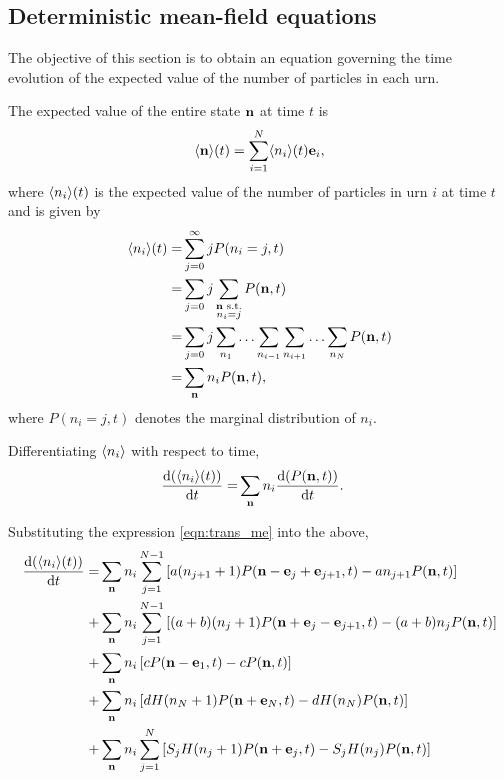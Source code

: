 \subsection{Deterministic mean-field equations}
The objective of this section is to obtain an equation governing the time
evolution of the expected value of the number of particles in each urn.

The expected value of the entire state \(\mathbf{n}\) at time \(t\) is
\begin{equation*}
    \langle \mathbf{n} \rangle(t) = \sum_{i=1}^N \langle n_i \rangle(t) \mathbf{e}_i,
\end{equation*}
where \(\langle n_i \rangle(t)\) is the expected value of the number of particles in urn
\(i\) at time \(t\) and is given by
\begin{align*}
    \langle n_i \rangle(t) =& \sum_{j=0}^\infty j P(n_i = j,t)\\
    =& \sum_{j=0} j
    \sum_{\substack{\mathbf{n} \text{ s.t.} \\ n_i=j}} P(\mathbf{n},t)\\
    =& \sum_{j=0} j
    \sum_{n_1} \dotso \sum_{n_{i-1}} \sum_{n_{i+1}} \dotso \sum_{n_N} P(\mathbf{n},t)\\
    =& \sum_{\mathbf{n}} n_i P(\mathbf{n},t),
\end{align*}
where \(P(n_i = j,t)\) denotes the marginal distribution of \(n_i\).

Differentiating \(\langle n_i \rangle\) with respect to time,
\begin{align*}
    \frac{\mathrm{d} (\langle n_i \rangle(t))}{\mathrm{d} t} =& \sum_{\mathbf{n}} n_i \frac{\mathrm{d} (P(\mathbf{n},t))}{\mathrm{d} t}.
\end{align*}

Substituting the expression \eqref{eqn:trans_me} into the above,
\begin{subequations}
\begin{align}
    \label{eqn:trans_expectation_hl_term}
    \frac{\mathrm{d} (\langle n_i \rangle(t))}{\mathrm{d} t}
    = & \sum_{\mathbf{n}} n_i \sum_{j=1}^{N-1}
    \left[a(n_{j+1}+1) P(\mathbf{n} - \mathbf{e}_j + \mathbf{e}_{j+1},t) -
        an_{j+1} P(\mathbf{n},t)\right] \\
    \label{eqn:trans_expectation_hr_term}
    + & \sum_{\mathbf{n}} n_i \sum_{j=1}^{N-1}
    \left[(a+b)(n_j+1) P(\mathbf{n} + \mathbf{e}_j - \mathbf{e}_{j+1},t) -
        (a+b)n_j P(\mathbf{n},t)\right] \\
    \label{eqn:trans_expectation_in_term}
    + & \sum_{\mathbf{n}} n_i
    \left[c P(\mathbf{n} - \mathbf{e}_1,t) - c P(\mathbf{n},t)\right] \\
    \label{eqn:trans_expectation_out_term}
    + & \sum_{\mathbf{n}} n_i
    \left[d H(n_N+1) P(\mathbf{n} + \mathbf{e}_N,t) - d H(n_N) P(\mathbf{n},t)\right] \\
    \label{eqn:trans_expectation_rem_term}
    + & \sum_{\mathbf{n}} n_i \sum_{j=1}^{N}
    \left[S_j H(n_j + 1) P(\mathbf{n} + \mathbf{e}_j,t) - S_j H(n_j) P(\mathbf{n},t)\right]
\end{align}
\end{subequations}

